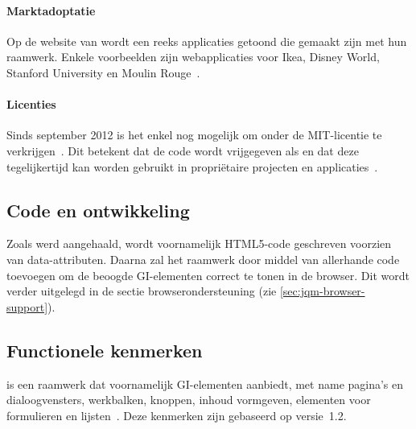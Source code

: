 \paragraph{Marktadoptatie}
Op de website van \jqm{} wordt een reeks applicaties getoond die gemaakt zijn met hun raamwerk. 
Enkele voorbeelden zijn webapplicaties voor Ikea, Disney World, Stanford University en Moulin Rouge~\cite{JQuery2012a}. 

\paragraph{Licenties}
Sinds september 2012 is het enkel nog mogelijk om \jqm{} onder de MIT-licentie te verkrijgen~\cite{Dmethvin2012}. 
Dit betekent dat de code wordt vrijgegeven als  en dat deze tegelijkertijd kan worden gebruikt in propriëtaire projecten en applicaties~\cite{PhilDutson2012}.

\subsection{Code en ontwikkeling}
Zoals werd aangehaald, wordt voornamelijk HTML5-code geschreven voorzien van data-attributen. 
Daarna zal het raamwerk door middel van  allerhande code toevoegen om de beoogde GI-elementen correct te tonen in de browser. 
Dit wordt verder uitgelegd in de sectie browserondersteuning (zie \ref{sec:jqm-browser-support}).

\subsection{Functionele kenmerken}
\jqm{} is een raamwerk dat voornamelijk GI-elementen aanbiedt, met name pagina's en dialoogvensters, werkbalken, knoppen, inhoud vormgeven, elementen voor formulieren en lijsten~\cite{JQuery2012b}.
Deze kenmerken zijn gebaseerd op versie~1.2.

